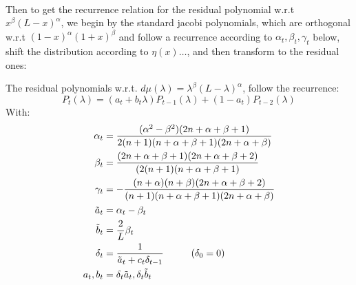 \documentclass{article}
\begin{document}
\paragraph{}
\label{jacobi recurrence}
Then to get  the recurrence relation for the residual polynomial w.r.t $x^\beta(L-x)^\alpha$, we begin by the standard jacobi polynomials, which are orthogonal w.r.t $(1-x)^\alpha(1+x)^\beta$ and follow a recurrence according to $\alpha_t,\beta_t,\gamma_t$ below, shift the distribution according to $\eta(x)\ldots$, and then transform to the residual ones:
\begin{prop}
The residual polynomials w.r.t. $d\mu(\lambda)=\lambda^\beta(L-\lambda)^\alpha$, follow the recurrence:
\begin{equation*}
    P_t(\lambda)=(a_t+b_t\lambda)P_{t-1}(\lambda)+(1-a_t)P_{t-2}(\lambda)
\end{equation*}
With:
\begin{align}
    \alpha_t&=\frac{(\alpha^2-\beta^2)(2n+\alpha+\beta+1)}{
            2(n+1)(n+\alpha+\beta+1)(2n+\alpha+\beta)} \\
        \beta_t&=\frac{(2n+\alpha+\beta+1)(2n+\alpha+\beta+2)}{
            (2(n+1)(n+\alpha+\beta+1)} \\
        \gamma_t&=-\frac{(n+\alpha)(n+\beta)(2n+\alpha+\beta+2)}{
            (n+1)(n+\alpha+\beta+1)(2n+\alpha+\beta)} \\
        \tilde{a}_t&=\alpha_t-\beta_t \\
        \tilde{b}_t&=\frac{2}{L}\beta_t \\
        \delta_t&=\frac{1}{\tilde{a}_t+c_t\delta_{t-1}}  \hspace{1 cm} (\delta_0=0)\\
        a_t,b_t&=\delta_t\tilde{a}_t,\delta_t\tilde{b}_t
\end{align}


\end{prop}
\end{document}
